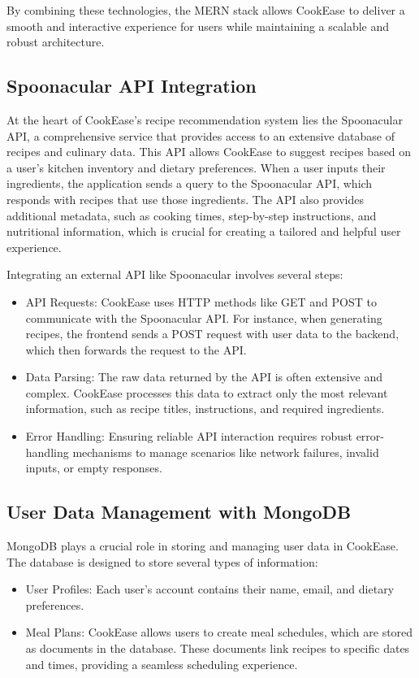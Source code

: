 \documentclass[10pt,twocolumn]{article}
\begin{document}
By combining these technologies, the MERN stack allows CookEase to deliver a smooth and interactive experience for users while maintaining a scalable and robust architecture.

\subsection{Spoonacular API Integration}
At the heart of CookEase’s recipe recommendation system lies the Spoonacular API, a comprehensive service that provides access to an extensive database of recipes and culinary data. This API allows CookEase to suggest recipes based on a user’s kitchen inventory and dietary preferences. When a user inputs their ingredients, the application sends a query to the Spoonacular API, which responds with recipes that use those ingredients. The API also provides additional metadata, such as cooking times, step-by-step instructions, and nutritional information, which is crucial for creating a tailored and helpful user experience.

Integrating an external API like Spoonacular involves several steps:
\begin{itemize}
    \item API Requests: CookEase uses HTTP methods like GET and POST to communicate with the Spoonacular API. For instance, when generating recipes, the frontend sends a POST request with user data to the backend, which then forwards the request to the API.
    \item Data Parsing: The raw data returned by the API is often extensive and complex. CookEase processes this data to extract only the most relevant information, such as recipe titles, instructions, and required ingredients.
    \item Error Handling: Ensuring reliable API interaction requires robust error-handling mechanisms to manage scenarios like network failures, invalid inputs, or empty responses.
\end{itemize}

\subsection{User Data Management with MongoDB}
MongoDB plays a crucial role in storing and managing user data in CookEase. The database is designed to store several types of information:
\begin{itemize}
    \item User Profiles: Each user’s account contains their name, email, and dietary preferences.
    \item Meal Plans: CookEase allows users to create meal schedules, which are stored as documents in the database. These documents link recipes to specific dates and times, providing a seamless scheduling experience.
\end{itemize}
\end{document}
